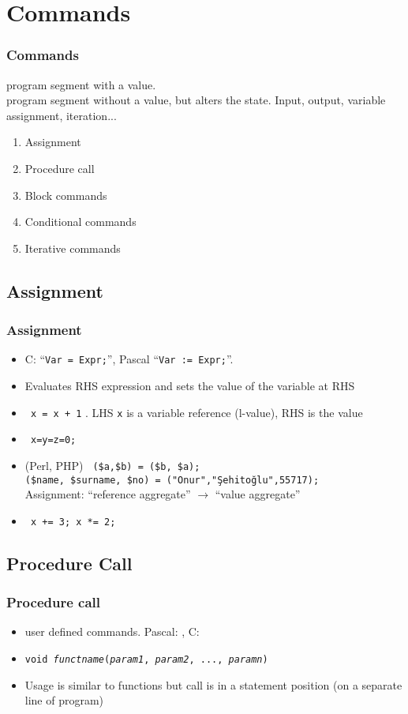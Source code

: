 \section{Commands}
\begin{frame}
 \frametitle{Commands}
  program segment with a value.\\
  program segment without a value, but alters the state. Input, output, variable assignment, iteration...
\begin{enumerate}
 \item Assignment
 \item Procedure call
 \item Block commands
 \item Conditional commands
 \item Iterative commands
\end{enumerate}
\end{frame}

\subsection{Assignment}
\begin{frame}
 \frametitle{Assignment}
\begin{itemize}
 \item C: ``\texttt{Var = Expr;}'', Pascal ``\texttt{Var := Expr;}''.
 \item Evaluates RHS expression and sets the value of the variable at RHS
 \item \texttt{ x = x + 1} . LHS \texttt{x} is a variable reference (l-value), RHS is the value
 \item  {} \texttt{ x=y=z=0;}
 \item {} (Perl, PHP) \texttt{ (\$a,\$b) = (\$b, \$a);} \\
	\texttt{(\$name, \$surname, \$no) = ("Onur","Şehitoğlu",55717);} \\
	Assignment: ``reference aggregate'' $\rightarrow$ ``value aggregate''
 \item {} \texttt{ x += 3; x *= 2; }
\end{itemize}
\end{frame}

\subsection{Procedure Call}
\begin{frame}
 \frametitle{Procedure call}
\begin{itemize}
 \item {} user defined commands. Pascal: , 
	C: 
 \item \texttt{void {\em functname\/}({\em param1\/}, {\em param2\/}, ..., {\em paramn\/})}
 \item Usage is similar to functions but call is in a statement position (on a separate line of
	program)
\end{itemize}
\end{frame}

